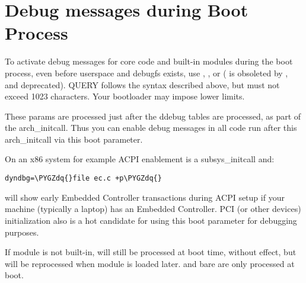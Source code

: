 \documentclass[a4paper,8pt,english]{sphinxmanual}
\def\PYGZdq{\char`\"}
\begin{document}
\section{Debug messages during Boot Process}
\label{admin-guide/dynamic-debug-howto:debug-messages-during-boot-process}
To activate debug messages for core code and built-in modules during
the boot process, even before userspace and debugfs exists, use
, , or 
( is obsoleted by , and deprecated).  QUERY follows
the syntax described above, but must not exceed 1023 characters.  Your
bootloader may impose lower limits.

These  params are processed just after the ddebug tables are
processed, as part of the arch\_initcall.  Thus you can enable debug
messages in all code run after this arch\_initcall via this boot
parameter.

On an x86 system for example ACPI enablement is a subsys\_initcall and:

\begin{Verbatim}[commandchars=\\\{\}]
dyndbg=\PYGZdq{}file ec.c +p\PYGZdq{}
\end{Verbatim}

will show early Embedded Controller transactions during ACPI setup if
your machine (typically a laptop) has an Embedded Controller.
PCI (or other devices) initialization also is a hot candidate for using
this boot parameter for debugging purposes.

If  module is not built-in,  will still be processed at
boot time, without effect, but will be reprocessed when module is
loaded later.  and bare  are only processed at
boot.
\end{document}
